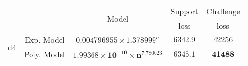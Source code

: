 \begin{tabular}{ccccc} 
\hline 
 &  & \multirow{2}{*}{Model} & Support & Challenge\tabularnewline 
 &  &  & loss  & loss\tabularnewline 
\hline 
\hline 
\multirow{2}{*}{d4} & Exp. Model & $0.004796955\times 1.378999^{n}$ & $6342.9$ & $42256$ \tabularnewline 
 & Poly. Model & $\mathbf{1.99368\times10^{-10}\times n^{7.780023}}$ & $\mathbf{6345.1}$ & $\mathbf{41488}$ \tabularnewline 
\hline 
\end{tabular} 

